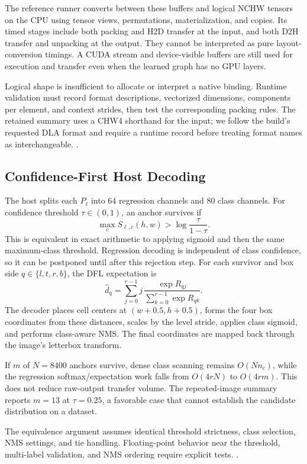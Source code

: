 The reference runner converts between these buffers and logical NCHW tensors
on the CPU using tensor views, permutations, materialization, and copies.
Its timed stages include both packing and H2D transfer at the input, and both
D2H transfer and unpacking at the output. They cannot be interpreted as pure
layout-conversion timings. A CUDA stream and device-visible buffers are still
used for execution and transfer even when the learned graph has no GPU layers.

Logical shape is insufficient to allocate or interpret a native binding.
Runtime validation must record format descriptions, vectorized dimensions,
components per element, and context strides, then test the corresponding
packing rules. The retained summary uses a CHW4 shorthand for the input;
we follow the build's requested DLA format and require a runtime record before
treating format names as interchangeable.
.

\subsection{Confidence-First Host Decoding}
\label{sec:decode}
The host splits each $P_\ell$ into 64 regression channels and 80 class channels.
For confidence threshold $\tau\in(0,1)$, an anchor survives if
\begin{equation}
 \max_c S_{\ell,c}(h,w) > \log\frac{\tau}{1-\tau}.
 \label{eq:threshold}
\end{equation}
This is equivalent in exact arithmetic to applying sigmoid and then the same
maximum-class threshold. Regression decoding is independent of class
confidence, so it can be postponed until after this rejection step. For each
survivor and box side $q\in\{l,t,r,b\}$, the DFL expectation is
\begin{equation}
 \hat d_q=\sum_{j=0}^{r-1}j\,
 \frac{\exp R_{qj}}{\sum_{k=0}^{r-1}\exp R_{qk}}.
 \label{eq:dfl}
\end{equation}
The decoder places cell centers at $(w+0.5,h+0.5)$, forms the four box
coordinates from these distances, scales by the level stride, applies class
sigmoid, and performs class-aware NMS. The final coordinates are mapped back
through the image's letterbox transform.

If $m$ of $N=8400$ anchors survive, dense class scanning remains
$O(Nn_c)$, while the regression softmax/expectation work falls from $O(4rN)$
to $O(4rm)$. This does not reduce raw-output transfer volume. The repeated-image
summary reports $m=13$ at $\tau=0.25$, a favorable case that cannot establish
the candidate distribution on a dataset.

The equivalence argument assumes identical threshold strictness, class
selection, NMS settings, and tie handling. Floating-point behavior near the
threshold, multi-label validation, and NMS ordering require explicit tests.
.
